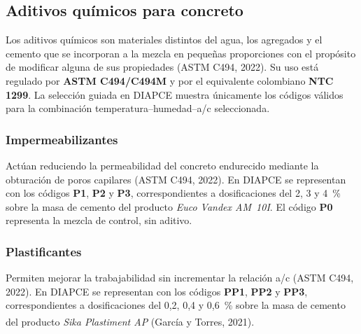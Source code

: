 \documentclass[12pt, letterpaper]{article}
\begin{document}
\subsection{Aditivos químicos para concreto}

Los aditivos químicos son materiales distintos del agua, los agregados y el cemento que se incorporan a la mezcla en pequeñas proporciones con el propósito de modificar alguna de sus propiedades (ASTM C494, 2022). Su uso está regulado por \textbf{ASTM C494/C494M} y por el equivalente colombiano \textbf{NTC 1299}. La selección guiada en DIAPCE muestra únicamente los códigos válidos para la combinación temperatura–humedad–a/c seleccionada.

\subsubsection*{Impermeabilizantes}

Actúan reduciendo la permeabilidad del concreto endurecido mediante la obturación de poros capilares (ASTM C494, 2022). En DIAPCE se representan con los códigos \textbf{P1}, \textbf{P2} y \textbf{P3}, correspondientes a dosificaciones del 2, 3 y 4~\% sobre la masa de cemento del producto \textit{Euco Vandex AM~10I}. El código \textbf{P0} representa la mezcla de control, sin aditivo.

\subsubsection*{Plastificantes}

Permiten mejorar la trabajabilidad sin incrementar la relación a/c (ASTM C494, 2022). En DIAPCE se representan con los códigos \textbf{PP1}, \textbf{PP2} y \textbf{PP3}, correspondientes a dosificaciones del 0{,}2, 0{,}4 y 0{,}6~\% sobre la masa de cemento del producto \textit{Sika\textsuperscript{\textregistered} Plastiment\textsuperscript{\textregistered} AP} (García y Torres, 2021).
\end{document}
